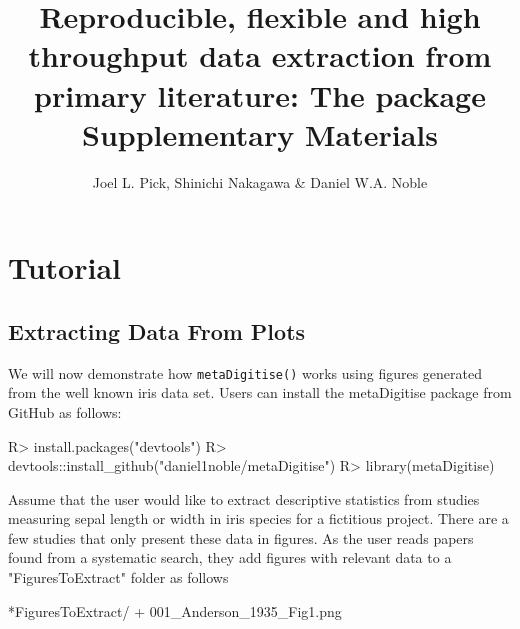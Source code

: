 \documentclass[12pt]{article}
\title{Reproducible, flexible and high throughput data extraction from primary literature: The \pkg{metaDigitise} \proglang{R} package \vskip15pt Supplementary Materials}
\author{Joel L. Pick, Shinichi Nakagawa \& Daniel W.A. Noble}
\newcommand{\fct}[1]{\texttt{#1()}}
\newcommand{\pkg}[1]{{\fontseries{b}\selectfont #1}}
\begin{document}
\newenvironment{CodeChunk}{}{}

\setcounter{equation}{0}
\setcounter{subsection}{0}

\renewcommand{\thetable}{S\arabic{table}}%
\renewcommand{\theequation}{S\arabic{equation}}%
\renewcommand{\thesection}{S\arabic{section}}%
\renewcommand{\thesubsection}{S\arabic{section}.\arabic{subsection}}%



\maketitle

\clearpage

\section{Tutorial}
\subsection{Extracting Data From Plots}


We will now demonstrate how \fct{metaDigitise} works using figures generated from the well known iris data set. Users can install the \pkg{metaDigitise} package from GitHub as follows:

\begin{CodeChunk}
\begin{CodeInput}
R> install.packages("devtools")
R> devtools::install_github("daniel1noble/metaDigitise")
R> library(metaDigitise)
\end{CodeInput}
\end{CodeChunk}

Assume that the user would like to extract descriptive statistics from studies measuring sepal length or width in iris species for a fictitious project. There are a few studies that only present these data in figures. As the user reads papers found from a systematic search, they add figures with relevant data to a "FiguresToExtract" folder as follows

\begin{CodeChunk}
\begin{CodeOutput}
*FiguresToExtract/
    + 001_Anderson_1935_Fig1.png
\end{CodeOutput}
\end{CodeChunk}
\end{document}
